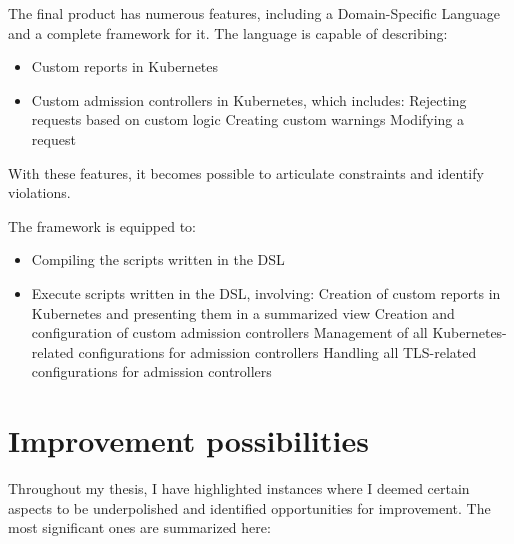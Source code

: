 The final product has numerous features, including a Domain-Specific Language and a complete framework for it. The language is capable of describing:

\begin{itemize}
    \item Custom reports in Kubernetes
    \item Custom admission controllers in Kubernetes, which includes:
    \subitem Rejecting requests based on custom logic
    \subitem Creating custom warnings
    \subitem Modifying a request
\end{itemize}

With these features, it becomes possible to articulate constraints and identify violations.

The framework is equipped to:

\begin{itemize}
    \item Compiling the scripts written in the DSL
    \item Execute scripts written in the DSL, involving:
    \subitem Creation of custom reports in Kubernetes and presenting them in a summarized view
    \subitem Creation and configuration of custom admission controllers
    \subitem Management of all Kubernetes-related configurations for admission controllers
    \subitem Handling all TLS-related configurations for admission controllers
\end{itemize}

\section{Improvement possibilities}

Throughout my thesis, I have highlighted instances where I deemed certain aspects to be underpolished and identified opportunities for improvement. The most significant ones are summarized here:

